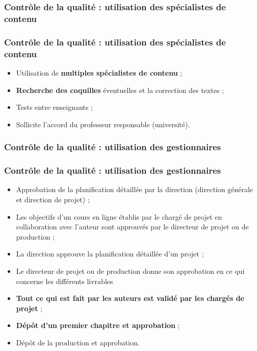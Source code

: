					\subsubsection{Contrôle de la qualité : utilisation des spécialistes de contenu} 
							\begin{frame}
							\frametitle{Contrôle de la qualité : utilisation des spécialistes de contenu}
                        			
							\begin{itemize}
							
							\item Utilisation de \textbf{multiples spécialistes de contenu} ;
							\item \textbf{Recherche des coquilles} éventuelles et la correction des textes ;
							\item Tests entre enseignants ;
							\item Sollicite l’accord du professeur responsable (université).
							\end{itemize}						
					\end{frame}	
					
					\subsubsection{Contrôle de la qualité : utilisation des gestionnaires} 
							\begin{frame}
							\frametitle{Contrôle de la qualité : utilisation des gestionnaires}
                        			
							\begin{itemize}
							\item Approbation de la planification détaillée par la direction (direction générale et direction de projet) ;
							\item Les objectifs d’un cours en ligne établis par le chargé de projet en collaboration avec l’auteur sont approuvés par le directeur de projet ou de production ;
							\item La direction approuve la planification détaillée d’un projet ;
							\item Le directeur de projet ou de production donne son approbation en ce qui concerne les différents livrables
							\item \textbf{Tout ce qui est fait par les auteurs est validé par les chargés de projet} ;
							\item \textbf{Dépôt d’un premier chapitre et approbation} ;
							\item Dépôt de la production et approbation.
							\end{itemize}						
					\end{frame}	
					
